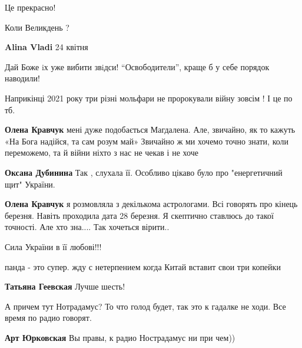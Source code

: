  
 
 
 
 
\zzSecCmt

\begin{itemize} %
Це прекрасно!

Коли Великдень ?

\textbf{Alina Vladi} 24 квітня

Дай Боже iх уже вибити звiдси! \enquote{Освободители}, краще б у себе порядок наводили!

Наприкінці 2021 року три різні мольфари не пророкували війну зовсім ! І це по тб.

\begin{itemize} %
\textbf{Олена Кравчук} мені дуже подобається Магдалена. Але, звичайно, як то кажуть «На Бога надійся, та сам розум май»
Звичайно ж ми хочемо точно знати, коли переможемо, та й війни ніхто з нас не чекав і не хоче

\textbf{Оксана Дубинина} Так , слухала її. Особливо цікаво було про "енергетичний щит" України.

\textbf{Олена Кравчук} я розмовляла з декількома астрологами. Всі говорять про кінець березня. Навіть проходила дата 28 березня. Я скептично ставлюсь до такої точності. Але хто зна.... Так хочеться вірити..
\end{itemize} %

Сила України в її любові!!!

панда - это супер. жду с нетерпением когда Китай вставит свои три копейки

\textbf{Татьяна Геевская} Лучше шесть!


А причем тут Нотрадамус? То что голод будет, так это к гадалке не ходи. Все
время по радио говорят.

\begin{itemize} %
\textbf{Арт Юрковская} Вы правы, к радио Нострадамус ни при чем))


\end{itemize}
\end{itemize}
